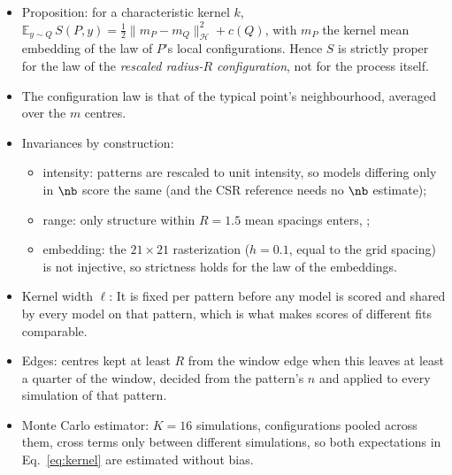 \begin{itemize}
  \item Proposition: for a characteristic kernel $k$, $\mathbb{E}_{y\sim Q}\,S(P,y)
        =\tfrac12\|m_P-m_Q\|_{\mathcal H}^2+c(Q)$, with $m_P$ the kernel mean embedding of the law of $P$'s local
        configurations. Hence $S$ is strictly proper for the law of the \emph{rescaled radius-$R$ configuration},
        not for the process itself. 
  \item The configuration law is that of the typical point's neighbourhood, averaged over
        the $m$ centres.
  \item Invariances by construction:
  \begin{itemize}
    \item intensity: patterns are rescaled to unit intensity, so models differing only in $\nb$ score the same
          (and the CSR reference needs no $\nb$ estimate);
    \item range: only structure within $R=1.5$ mean spacings enters, ;
    \item embedding: the $21\times21$ rasterization ($h=0.1$, equal to the grid spacing) is not injective, so
          strictness holds for the law of the embeddings.
  \end{itemize}
  \item Kernel width $\ell$:  It is fixed per pattern before any model is scored and
        shared by every model on that pattern, which is what makes scores of different fits comparable.
  \item Edges: centres kept at least $R$ from the window edge when this leaves at least a quarter of the window,
        decided from the pattern's $n$ and applied to every simulation of that pattern.
  \item Monte Carlo estimator: $K=16$ simulations, configurations pooled across them, cross terms only between
        different simulations, so both expectations in Eq.~\eqref{eq:kernel} are estimated without bias.
\end{itemize}

